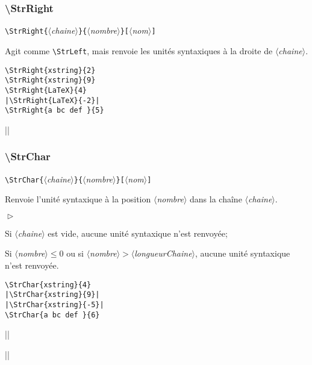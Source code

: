 \documentclass[a4paper,10pt]{article}
\newcommand\argu[1]{$\langle$\textit{#1}$\rangle$}
\newcommand\ARGU[1]{\texttt{\color{black}\{}\argu{#1}\texttt{\color{black}\}}}
\newcommand\arguC[1]{\texttt{\color{black}[}\argu{#1}\texttt{\color{black}]}}
\newenvironment{Conditions}[1][1cm]%
{\begin{list}%
	{$\vartriangleright$}%
	{\setlength{\leftmargin}{#1}
	 \setlength{\itemsep}{0pt}
	 \setlength{\parsep}{0pt}
	 \setlength{\topsep}{2ptplus3ptminus2pt}
	}}%
{\end{list}}
\newcommand\US{unité syntaxique\xspace}
\newcommand\USs{unités syntaxiques\xspace}
\newcommand\styleexemple{\small\vskip4pt}
\newcommand\verbinline{\lstinline[basicstyle=\normalsize\ttfamily]}
\begin{document}
\subsubsection{\ttfamily\textbackslash StrRight}
\verbinline|\StrRight|\ARGU{chaine}\ARGU{nombre}\arguC{nom}
\smallskip

Agit comme \verbinline|\StrLeft|, mais renvoie les \USs à la droite de \argu{chaine}.

\begin{minipage}[t]{0.65\linewidth}
\begin{lstlisting}
\StrRight{xstring}{2}
\StrRight{xstring}{9}
\StrRight{LaTeX}{4}
|\StrRight{LaTeX}{-2}|
\StrRight{a bc def }{5}
\end{lstlisting}%
\end{minipage}\hfill
\begin{minipage}[t]{0.35\linewidth}
	\styleexemple
	\par
	\par
	\par
	||\par
\end{minipage}%

\subsubsection{\ttfamily\textbackslash StrChar}
\verbinline|\StrChar|\ARGU{chaine}\ARGU{nombre}\arguC{nom}
\smallskip

Renvoie l'\US à la position \argu{nombre} dans la chaîne \argu{chaine}.\medskip

\begin{Conditions}
	\item Si \argu{chaine} est vide, aucune \US n'est renvoyée;
	\item Si \argu{nombre}${}\leqslant0$ ou si \argu{nombre}${}>{}$\argu{longueurChaine}, aucune \US n'est renvoyée.
\end{Conditions}

\begin{minipage}[t]{0.65\linewidth}
\begin{lstlisting}
\StrChar{xstring}{4}
|\StrChar{xstring}{9}|
|\StrChar{xstring}{-5}|
\StrChar{a bc def }{6}
\end{lstlisting}%
\end{minipage}\hfill
\begin{minipage}[t]{0.35\linewidth}
	\styleexemple
	\par
	||\par
	||\par
\end{minipage}%
\end{document}
